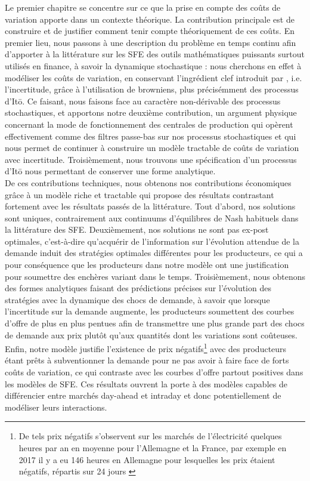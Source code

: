 Le premier chapitre se concentre sur ce que la prise en compte des coûts de variation apporte dans un contexte théorique. La contribution principale est de construire et de justifier comment tenir compte théoriquement de ces coûts. En premier lieu, nous passons à une description du problème en temps continu afin d'apporter à la littérature sur les SFE des outils mathématiques puissants surtout utilisés en finance, à savoir la dynamique stochastique : nous cherchons en effet à modéliser les coûts de variation, en conservant l'ingrédient clef introduit par \cite{KM}, i.e. l'incertitude, grâce à l'utilisation de browniens, plus précisémment des processus d'It\={o}. Ce faisant, nous faisons face au caractère non-dérivable des processus stochastiques, et apportons notre deuxième contribution, un argument physique concernant la mode de fonctionnement des centrales de production qui opèrent effectivement comme des filtres passe-bas sur nos processus stochastiques et qui nous permet de continuer à construire un modèle tractable de coûts de variation avec incertitude. Troisièmement, nous trouvons une spécification d'un processus d'It\={o} nous permettant de conserver une forme analytique. \\

De ces contributions techniques, nous obtenons nos contributions économiques grâce à un modèle riche et tractable qui propose des résultats contrastant fortement avec les résultats passés de la littérature. Tout d'abord, nos solutions sont uniques, contrairement aux continuums d'équilibres de Nash habituels dans la littérature des SFE. Deuxièmement, nos solutions ne sont pas ex-post optimales, c'est-à-dire qu'acquérir de l'information sur l'évolution attendue de la demande induit des stratégies optimales différentes pour les producteurs, ce qui a pour conséquence que les producteurs dans notre modèle ont une justification pour soumettre des enchères variant dans le temps. Troisièmement, nous obtenons des formes analytiques faisant des prédictions précises sur l'évolution des stratégies avec la dynamique des chocs de demande, à savoir que lorsque l'incertitude sur la demande augmente, les producteurs soumettent des courbes d'offre de plus en plus pentues afin de transmettre une plus grande part des chocs de demande aux prix plutôt qu'aux quantités dont les variations sont coûteuses. Enfin, notre modèle justifie l'existence de prix négatifs\footnote{De tels prix négatifs s'observent sur les marchés de l'électricité quelques heures par an en moyenne pour l'Allemagne et la France, par exemple en 2017 il y a eu 146 heures en Allemagne pour lesquelles les prix étaient négatifs, répartis sur 24 jours \cite{epexnegP}} avec des producteurs étant prêts à subventionner la demande pour ne pas avoir à faire face de forts coûts de variation, ce qui contraste avec les courbes d'offre partout positives dans les modèles de SFE. Ces résultats ouvrent la porte à des modèles capables de différencier entre marchés day-ahead et intraday et donc potentiellement de modéliser leurs interactions.\\

